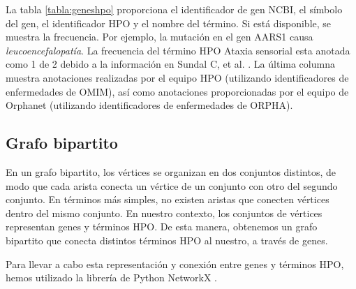 La tabla \ref{tabla:geneshpo} proporciona el identificador de gen NCBI, el símbolo del gen, el identificador HPO y el nombre del término. Si está disponible, se muestra la frecuencia. Por ejemplo, la mutación en el gen AARS1 causa \textit{leucoencefalopatía}. La frecuencia del término HPO Ataxia sensorial esta anotada como 1 de 2 debido a la información en Sundal C, et al. \cite{Sundal2019}. La última columna muestra anotaciones realizadas por el equipo HPO (utilizando identificadores de enfermedades de OMIM), así como anotaciones proporcionadas por el equipo de Orphanet (utilizando identificadores de enfermedades de ORPHA).

\subsection{Grafo bipartito}


En un grafo bipartito, los vértices se organizan en dos conjuntos distintos, de modo que cada arista conecta un vértice de un conjunto con otro del segundo conjunto. En términos más simples, no existen aristas que conecten vértices dentro del mismo conjunto. En nuestro contexto, los conjuntos de vértices representan genes y términos HPO. De esta manera, obtenemos un grafo bipartito que conecta distintos términos HPO al nuestro, a través de genes. 

Para llevar a cabo esta representación y conexión entre genes y términos HPO, hemos utilizado la librería de Python NetworkX \cite{BookNetworkX}. 